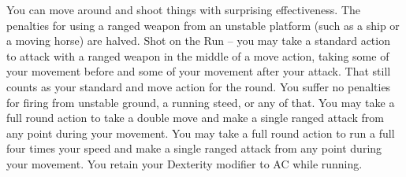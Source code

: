 {You can move around and shoot things with surprising effectiveness.}
{The penalties for using a ranged weapon from an unstable platform (such as a ship or a moving horse) are halved.}
{Shot on the Run -- you may take a standard action to attack with a ranged weapon in the middle of a move action, taking some of your movement before and some of your movement after your attack. That still counts as your standard and move action for the round.}
{You suffer no penalties for firing from unstable ground, a running steed, or any of that.}
{You may take a full round action to take a double move and make a single ranged attack from any point during your movement.}
{You may take a full round action to run a full four times your speed and make a single ranged attack from any point during your movement. You retain your Dexterity modifier to AC while running.}
